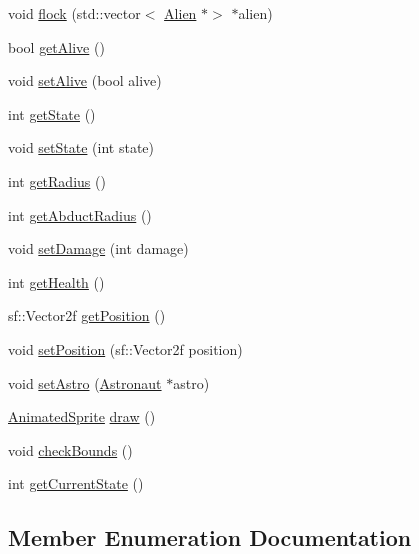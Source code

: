 \begin{DoxyCompactItemize}
\item 
void \hyperlink{class_alien_a087d886ecd8b70d2554bb54fae81528d}{flock} (std\+::vector$<$ \hyperlink{class_alien}{Alien} $\ast$$>$ $\ast$alien)
\item 
bool \hyperlink{class_alien_a6da0e947ec0c70d429e54511d67ad608}{get\+Alive} ()
\item 
void \hyperlink{class_alien_a1f8e8072e38c88e7299867ce08e169f4}{set\+Alive} (bool alive)
\item 
int \hyperlink{class_alien_a4954611d3a021f57a02564f17a3b0efc}{get\+State} ()
\item 
void \hyperlink{class_alien_aead215fe05108897f31e12c9e58b0d90}{set\+State} (int state)
\item 
int \hyperlink{class_alien_ab649dc3a1c86463c29b32931683685ab}{get\+Radius} ()
\item 
int \hyperlink{class_alien_a9dbe59b6c7ec7ad946e113f0f05f7427}{get\+Abduct\+Radius} ()
\item 
void \hyperlink{class_alien_a5f1364d7d592e43230971365bb58d5a3}{set\+Damage} (int damage)
\item 
int \hyperlink{class_alien_aa83dd26e21c40429865e3f84018545a0}{get\+Health} ()
\item 
sf\+::\+Vector2f \hyperlink{class_alien_a52dc07105cf8ff2a25961ecebf9fbbe1}{get\+Position} ()
\item 
void \hyperlink{class_alien_a751c54dcc0d77d92c6540b05b0fef50a}{set\+Position} (sf\+::\+Vector2f position)
\item 
void \hyperlink{class_alien_a23b7f6d84b71e233834a36ee37e90b14}{set\+Astro} (\hyperlink{class_astronaut}{Astronaut} $\ast$astro)
\item 
\hyperlink{class_animated_sprite}{Animated\+Sprite} \hyperlink{class_alien_a518e51803e638c46d0452ba283f2aad6}{draw} ()
\item 
void \hyperlink{class_alien_a1f94914265a34170958fbf0cc4dbf187}{check\+Bounds} ()
\item 
int \hyperlink{class_alien_a3165f3c2c824c3784dd0054d48fd5c5a}{get\+Current\+State} ()
\end{DoxyCompactItemize}


\subsection{Member Enumeration Documentation}
\mbox{\label{class_alien_a46333b42b6e6dff962c3236b7012ec8c}} 
